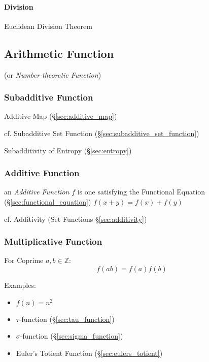 \paragraph{Division}\label{sec:addition}\hfill

Euclidean Division Theorem



\subsection{Arithmetic Function}\label{sec:arithmetic_function}

(or \emph{Number-theoretic Function})



\subsubsection{Subadditive Function}\label{sec:subadditive_function}

Additive Map (\S\ref{sec:additive_map})

cf. Subadditive Set Function (\S\ref{sec:subadditive_set_function})

Subadditivity of Entropy (\S\ref{sec:entropy})



\subsubsection{Additive Function}\label{sec:additive_function}

an \emph{Additive Function} $f$ is one satisfying the Functional Equation
(\S\ref{sec:functional_equation}) $f(x+y) = f(x) + f(y)$

cf. Additivity (Set Functions \S\ref{sec:additivity})



\subsubsection{Multiplicative Function}\label{sec:multiplicative_function}

For Coprime $a,b \in \mathbb{Z}$:
\[
  f(ab) = f(a)f(b)
\]

Examples:
\begin{itemize}
  \item $f(n) = n^2$
  \item $\tau$-function (\S\ref{sec:tau_function})
  \item $\sigma$-function (\S\ref{sec:sigma_function})
  \item Euler's Totient Function (\S\ref{sec:eulers_totient})
\end{itemize}



